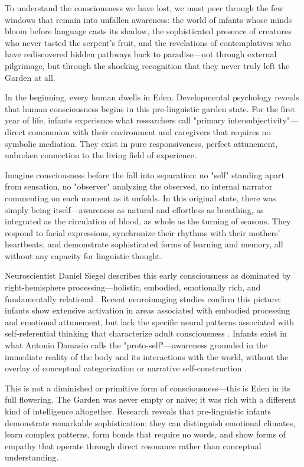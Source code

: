 To understand the consciousness we have lost, we must peer through the few windows that remain into unfallen awareness: the world of infants whose minds bloom before language casts its shadow, the sophisticated presence of creatures who never tasted the serpent's fruit, and the revelations of contemplatives who have rediscovered hidden pathways back to paradise—not through external pilgrimage, but through the shocking recognition that they never truly left the Garden at all.

In the beginning, every human dwells in Eden. Developmental psychology reveals that human consciousness begins in this pre-linguistic garden state. For the first year of life, infants experience what researchers call "primary intersubjectivity"—direct communion with their environment and caregivers that requires no symbolic mediation. They exist in pure responsiveness, perfect attunement, unbroken connection to the living field of experience.

Imagine consciousness before the fall into separation: no "self" standing apart from sensation, no "observer" analyzing the observed, no internal narrator commenting on each moment as it unfolds. In this original state, there was simply being itself—awareness as natural and effortless as breathing, as integrated as the circulation of blood, as whole as the turning of seasons. They respond to facial expressions, synchronize their rhythms with their mothers' heartbeats, and demonstrate sophisticated forms of learning and memory, all without any capacity for linguistic thought.

Neuroscientist Daniel Siegel describes this early consciousness as dominated by right-hemisphere processing—holistic, embodied, emotionally rich, and fundamentally relational \parencite{siegel2012mind}. Recent neuroimaging studies confirm this picture: infants show extensive activation in areas associated with embodied processing and emotional attunement, but lack the specific neural patterns associated with self-referential thinking that characterize adult consciousness \parencite{gao2009evidence,gao2017development}. Infants exist in what Antonio Damasio calls the "proto-self"—awareness grounded in the immediate reality of the body and its interactions with the world, without the overlay of conceptual categorization or narrative self-construction \parencite{damasio1999feeling}.

This is not a diminished or primitive form of consciousness—this is Eden in its full flowering. The Garden was never empty or naive; it was rich with a different kind of intelligence altogether. Research reveals that pre-linguistic infants demonstrate remarkable sophistication: they can distinguish emotional climates, learn complex patterns, form bonds that require no words, and show forms of empathy that operate through direct resonance rather than conceptual understanding.

